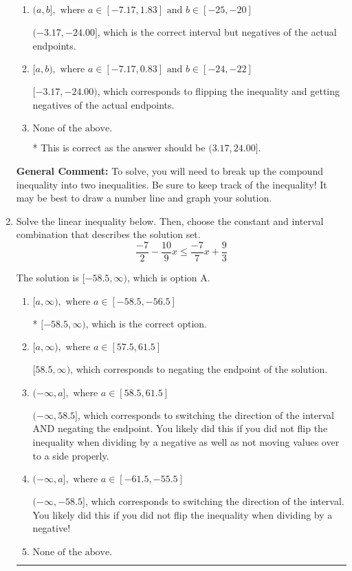 \documentclass{extbook}[14pt]
\newcommand{\litem}[1]{\item #1

\rule{\textwidth}{0.4pt}}
\begin{document}
\begin{enumerate}
{\begin{enumerate}[label=\Alph*.]
$(-\infty, -3.17) \cup [-24.00, \infty)$, which corresponds to displaying the and-inequality as an or-inequality and getting negatives of the actual endpoints.
\item \( (a, b], \text{ where } a \in [-7.17, 1.83] \text{ and } b \in [-25, -20] \)

$(-3.17, -24.00]$, which is the correct interval but negatives of the actual endpoints.
\item \( [a, b), \text{ where } a \in [-7.17, 0.83] \text{ and } b \in [-24, -22] \)

$[-3.17, -24.00)$, which corresponds to flipping the inequality and getting negatives of the actual endpoints.
\item \( \text{None of the above.} \)

* This is correct as the answer should be $(3.17, 24.00]$.
\end{enumerate}

\textbf{General Comment:} To solve, you will need to break up the compound inequality into two inequalities. Be sure to keep track of the inequality! It may be best to draw a number line and graph your solution.
}
\litem{
Solve the linear inequality below. Then, choose the constant and interval combination that describes the solution set.
\[ \frac{-7}{2} - \frac{10}{9} x \leq \frac{-7}{7} x + \frac{9}{3} \]

The solution is \( [-58.5, \infty) \), which is option A.\begin{enumerate}[label=\Alph*.]
\item \( [a, \infty), \text{ where } a \in [-58.5, -56.5] \)

* $[-58.5, \infty)$, which is the correct option.
\item \( [a, \infty), \text{ where } a \in [57.5, 61.5] \)

 $[58.5, \infty)$, which corresponds to negating the endpoint of the solution.
\item \( (-\infty, a], \text{ where } a \in [58.5, 61.5] \)

 $(-\infty, 58.5]$, which corresponds to switching the direction of the interval AND negating the endpoint. You likely did this if you did not flip the inequality when dividing by a negative as well as not moving values over to a side properly.
\item \( (-\infty, a], \text{ where } a \in [-61.5, -55.5] \)

 $(-\infty, -58.5]$, which corresponds to switching the direction of the interval. You likely did this if you did not flip the inequality when dividing by a negative!
\item \( \text{None of the above}. \)


\end{enumerate}}
\end{enumerate}
\end{document}
